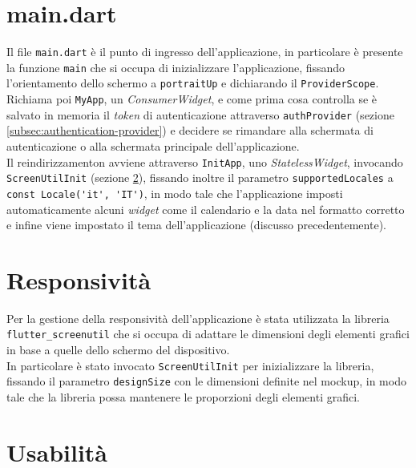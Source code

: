 \section{main.dart}
\label{sec:main}

Il file \lstinline{main.dart} è il punto di ingresso dell'applicazione, in particolare è presente la funzione \lstinline{main} che si occupa di inizializzare l'applicazione, fissando l'orientamento dello schermo a \lstinline{portraitUp} e dichiarando il \lstinline{ProviderScope}. \\
Richiama poi \lstinline{MyApp}, un \emph{ConsumerWidget}, e come prima cosa controlla se è salvato in memoria il \emph{token} di autenticazione attraverso \lstinline{authProvider} (sezione \ref{subsec:authentication-provider}) e decidere se rimandare alla schermata di autenticazione o alla schermata principale dell'applicazione. \\
Il reindirizzamenton avviene attraverso \lstinline{InitApp}, uno \emph{StatelessWidget}, invocando \lstinline{ScreenUtilInit} (sezione \ref{sec:responsivity}), fissando inoltre il parametro \lstinline{supportedLocales} a \lstinline{const Locale('it', 'IT')}, in modo tale che l'applicazione imposti automaticamente alcuni \emph{widget} come il calendario e la data nel formatto corretto e infine viene impostato il tema dell'applicazione (discusso precedentemente).

\section{Responsività}
\label{sec:responsivity}

Per la gestione della responsività dell'applicazione è stata utilizzata la libreria \lstinline{flutter_screenutil}\cite{site:screenutil} che si occupa di adattare le dimensioni degli elementi grafici in base a quelle dello schermo del dispositivo. \\
In particolare è stato invocato \lstinline{ScreenUtilInit} per inizializzare la libreria, fissando il parametro \lstinline{designSize} con le dimensioni definite nel \gls{mockup}\glsoccur, in modo tale che la libreria possa mantenere le proporzioni degli elementi grafici. 

\section{Usabilità}
\label{sec:usability}


